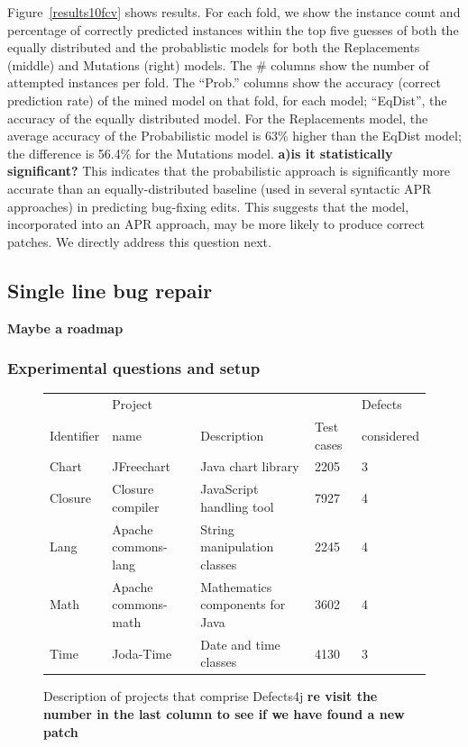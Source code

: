 \documentclass[conference]{IEEEtran}
\newcommand{\todo}[1]
  {{\scriptsize \textbf{\color{red} {#1}}}}
\begin{document}
Figure~\ref{results10fcv} shows results. For each fold, we show the instance
count and percentage of correctly predicted instances within the top five
guesses of both the equally distributed and the probablistic models for both the
Replacements (middle) and Mutations (right) models. The \# columns 
show the number of attempted instances per fold.  The ``Prob.'' columns show the
accuracy (correct prediction rate) of the mined model on that fold, for each model; ``EqDist'',
the accuracy of the equally distributed model.  For the Replacements model,
the average accuracy of the Probabilistic model is 63\% higher than the EqDist
model; the difference is 56.4\% for the Mutations model.  \todo{a)is it statistically
  significant?} This indicates that the probabilistic approach is
significantly more accurate than an equally-distributed baseline (used in
several syntactic APR approaches) in predicting bug-fixing edits.  This suggests
that the model, incorporated into an APR approach, may be more likely to produce
correct patches.  We directly address this question next.


\subsection{Single line bug repair}
\label{sec:single}

\todo{Maybe a roadmap}

\subsubsection{Experimental questions and setup}
\begin{figure}[ht]
\centering

\begin{tabular}{lllll}
\toprule
           &   Project  &             &   &  Defects\\
Identifier &    name & Description & Test cases & considered \\
\midrule
Chart & JFreechart & Java chart library & 2205 & 3\\
Closure	& Closure compiler	 & JavaScript handling tool & 7927 & 4\\
Lang	& Apache commons-lang & String manipulation classes  & 2245 & 4\\
Math	& Apache commons-math & Mathematics components for Java & 3602 & 4\\
Time	& Joda-Time & Date and time classes  & 4130 & 3\\
\bottomrule
\end{tabular}
\center
  \caption{Description of projects that comprise Defects4j \todo{re visit the number in the last column to see if we have found a new patch}}
  \label{defects4j}
\end{figure} 
\end{document}
